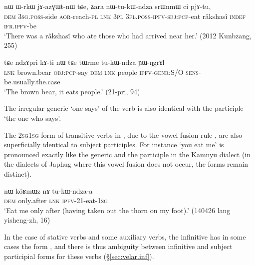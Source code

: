 \begin{exe}
\ex \label{ex:tukWndza.nmlz}
 \gll nɯ ɯ-rkɯ jɤ-azɣɯt-nɯ tɕe, ʑara nɯ-tu-kɯ-ndza srɯnmɯ ci pjɤ-tu, \\
 \textsc{dem} \textsc{3sg}.\textsc{poss}-side \textsc{aor}-reach-\textsc{pl} \textsc{lnk} \textsc{3pl} \textsc{3pl}.\textsc{poss}-\textsc{ipfv}-\textsc{sbj}:\textsc{pcp}-eat râkshasî \textsc{indef} \textsc{ifr}.\textsc{ipfv}-be \\
\glt `There was a râkshasî who ate those who had arrived near her.' (2012 Kunbzang, 255)
\end{exe}

\begin{exe}
\ex \label{ex:tukWndza.genr}
 \gll tɕe ndzɤpri kɤ-ti nɯ tɕe tɯrme tu-kɯ-ndza ɲɯ-ŋgrɤl  \\
 \textsc{lnk} brown.bear \textsc{obj}:\textsc{pcp}-say \textsc{dem} \textsc{lnk} people \textsc{ipfv}-\textsc{genr}:S/O \textsc{sens}-be.usually.the.case \\
\glt `The brown bear, it eats people.' (21-pri, 94)
\end{exe}
 
The irregular generic  `one says' of the verb  is also identical with the participle `the one who says'.

The \textsc{2sg}\fl{}\textsc{1sg} form of transitive verbs in , due to the vowel fusion rule  \fl{} , are also superficially identical to subject participles. For instance  `you eat me' is pronounced  exactly like the generic and the participle  in the Kamnyu dialect (in the dialects of Japhug where this vowel fusion does not occur, the forms remain distinct).

\begin{exe}
\ex \label{ex:tukWndzaa}
 \gll nɯ kóʁmɯz nɤ tu-kɯ-ndza-a \\
 \textsc{dem} only.after \textsc{lnk} \textsc{ipfv}-2\fl{}1-eat-\textsc{1sg} \\
 \glt `Eat me only after (having taken out the thorn on my foot).' (140426 lang yisheng-zh, 16)
\end{exe} 

In the case of stative verbs and some auxiliary verbs, the infinitive has in some cases the form , and there is thus ambiguity between infinitive and subject participial forms for these verbs (§\ref{sec:velar.inf}).

